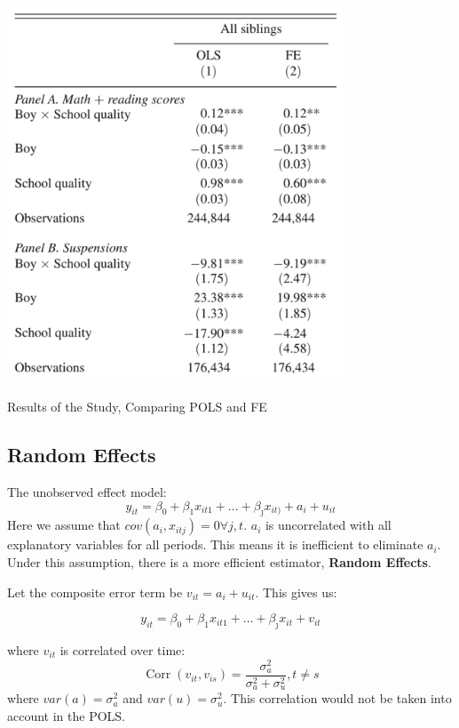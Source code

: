 \documentclass[11pt]{article}
\begin{document}
\begin{table}[h]
    \centering
    \includegraphics[width=10cm]{photos/fe application results.png}
    \caption{Results of the Study, Comparing POLS and FE}
    \label{tab:fe application results}
\end{table}


\subsection{Random Effects}

The unobserved effect model:
\begin{equation}
y_{i t}=\beta_0+\beta_1 x_{i t 1}+\ldots+\beta_{\jmath} x_{i t)}+a_i+u_{i t}
\end{equation}
Here we assume that $cov(a_i,x_{itj}) = 0 \forall j,t$. $a_i$ is uncorrelated with all explanatory variables for all periods. This means it is inefficient to eliminate $a_i$. Under this assumption, there is a more efficient estimator, \textbf{Random Effects}.

Let the composite error term be $v_{it} = a_i + u_{it}$. This gives us:

\[y_{i t}=\beta_0+\beta_1 x_{i t 1}+\ldots+\beta_{\jmath} x_{i t}+v_{it}\]

where $v_{it}$ is correlated over time:
\begin{equation}
\operatorname{Corr}\left(v_{i t}, v_{i s}\right)=\frac{\sigma_a^2}{\sigma_a^2+\sigma_u^2}, t \neq s
\end{equation}
where $var(a) = \sigma_a^2$ and $var(u) = \sigma_u^2$. This correlation would not be taken into account in the POLS.
\end{document}
